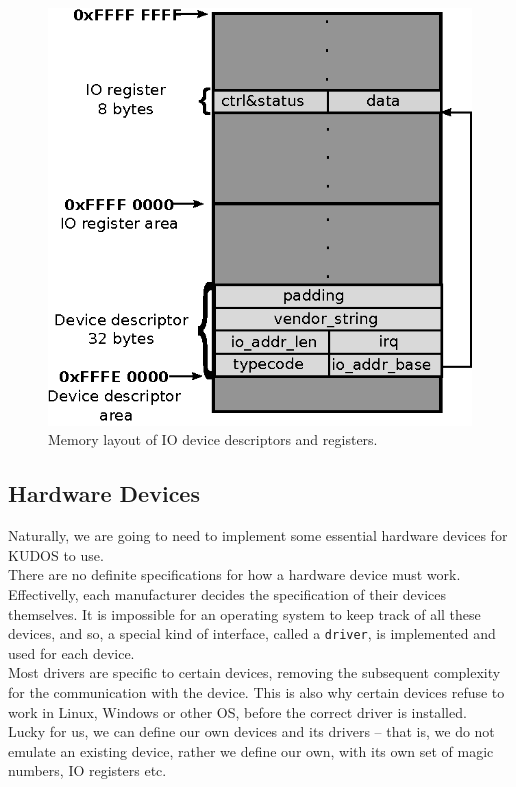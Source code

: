 \begin{figure}[H]
	\centering
	\includegraphics[scale=1]{io/io_memory_layout.eps}
	\caption{Memory layout of IO device descriptors and registers.}
	\label{fig:io_memory_layout}
\end{figure}


\subsection{Hardware Devices}
Naturally, we are going to need to implement some essential hardware devices
for KUDOS to use.\\
There are no definite specifications for how a hardware device must work.
Effectivelly, each manufacturer decides the specification of their devices
themselves. It is impossible for an operating system to keep track of all these
devices, and so, a special kind of interface, called a \texttt{driver},
is implemented and used for each device.\\
Most drivers are specific to certain devices, removing the subsequent complexity
for the communication with the device. This is also why certain devices refuse
to work in Linux, Windows or other OS, before the correct driver is installed.
\cite{microsoft:driver}\\
Lucky for us, we can define our own devices and its drivers -- that is,
we do not emulate an existing device, rather we define our own, with its own
set of magic numbers, IO registers etc.


